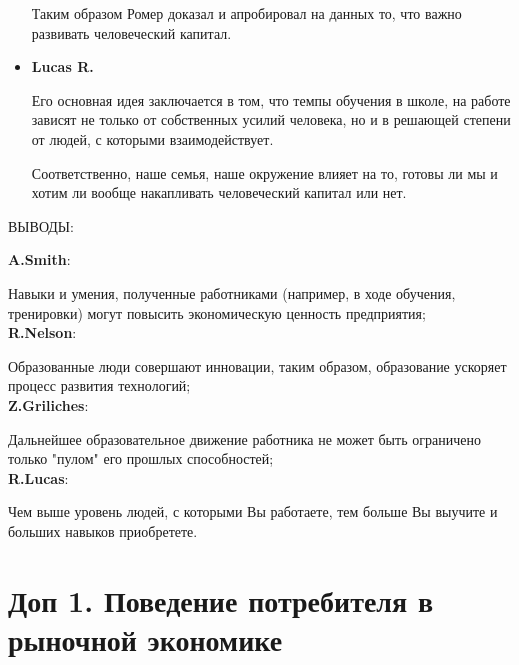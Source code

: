 \documentclass[reqno]{article}
\theoremstyle{definition}
\theoremstyle{definition}
\theoremstyle{definition}
\theoremstyle{definition}
\theoremstyle{definition}
\newtheorem{exc}{Упражнение}[section]
\theoremstyle{definition}
\theoremstyle{definition}
\theoremstyle{definition}
\theoremstyle{definition}
\begin{document}
\begin{itemize}
					Таким образом Ромер доказал и апробировал на данных то, что важно развивать человеческий капитал.
					
				\item \textbf{Lucas R.}	
				
					Его основная идея заключается в том, что темпы обучения в школе, на работе зависят не только от собственных усилий человека, но и в решающей степени от людей, с которыми взаимодействует.
					
					Соответственно, наше семья, наше окружение влияет на то, готовы ли мы и хотим ли вообще накапливать человеческий капитал или нет.
					
			\end{itemize}
		
			\newpage
			\begin{center}
				ВЫВОДЫ:
			\end{center}
			
			\textbf{A.Smith}: 
			
			Навыки и умения, полученные работниками (например, в ходе обучения, тренировки) могут повысить экономическую ценность предприятия;\\
					
			\textbf{R.Nelson}: 
			
			Образованные люди совершают инновации, таким образом, образование ускоряет процесс развития технологий;\\
				
			\textbf{Z.Griliches}:
			
			Дальнейшее образовательное движение работника не может быть ограничено только "пулом" его прошлых способностей;\\
				
			\textbf{R.Lucas}: 
			
			Чем выше уровень людей, с которыми Вы работаете, тем больше Вы выучите и больших навыков приобретете.
			
			
	\newpage
	\section{Доп 1. Поведение потребителя в рыночной экономике}
			
\end{document}
